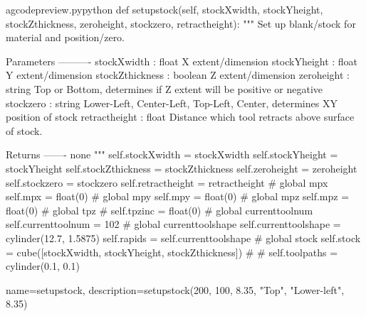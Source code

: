 \documentclass{ltxdoc}
\begin{document}
\lstset{firstnumber=\thegcpy}
\begin{writecode}{a}{gcodepreview.py}{python}
    def setupstock(self, stockXwidth, 
                 stockYheight, 
                 stockZthickness, 
                 zeroheight, 
                 stockzero, 
                 retractheight):
        """
        Set up blank/stock for material and position/zero.
        
        Parameters
        ----------
        stockXwidth :   float
                        X extent/dimension
        stockYheight :  float
                        Y extent/dimension
        stockZthickness : boolean
                        Z extent/dimension
        zeroheight :    string
                        Top or Bottom, determines if Z extent will be positive or negative
        stockzero :     string
                        Lower-Left, Center-Left, Top-Left, Center, determines XY position of stock 
        retractheight : float
                        Distance which tool retracts above surface of stock.
        
        Returns
        -------
        none
        """
        self.stockXwidth = stockXwidth
        self.stockYheight = stockYheight
        self.stockZthickness = stockZthickness
        self.zeroheight = zeroheight
        self.stockzero = stockzero
        self.retractheight = retractheight  
#        global mpx
        self.mpx = float(0)
#        global mpy
        self.mpy = float(0)
#        global mpz
        self.mpz = float(0)
#        global tpz
#        self.tpzinc = float(0)
#        global currenttoolnum
        self.currenttoolnum = 102
#        global currenttoolshape
        self.currenttoolshape = cylinder(12.7, 1.5875)
        self.rapids = self.currenttoolshape
#        global stock
        self.stock = cube([stockXwidth, stockYheight, stockZthickness])
#%
#%
        self.toolpaths = cylinder(0.1, 0.1)
\end{writecode}
\addtocounter{gcpy}{52}

{
    name=setupstock, 
    description={setupstock(200, 100, 8.35, "Top", "Lower-left", 8.35)}
}

%    
\end{document}
